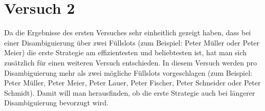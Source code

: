 \documentclass[12pt,a4paper]{scrartcl}
\begin{document}

\newpage
\section{Versuch 2}
\label{Verusch2}
Da die Ergebnisse des ersten Versuches sehr einheitlich gezeigt haben, dass bei einer Disambiguierung über zwei Füllslots (zum Beispiel: Peter Müller oder Peter Meier) die erste Strategie am effizientesten und beliebtesten ist, hat man sich zusätzlich für einen weiteren Versuch entschieden. In diesem Versuch werden pro Disambiguierung mehr als zwei mögliche Füllslots vorgeschlagen (zum Beispiel: Peter Müller, Peter Meier, Peter Lauer, Peter Fischer, Peter Schneider oder Peter Schmidt). Damit will man herausfinden, ob die erste Strategie auch bei längerer Disambiguierung bevorzugt wird.
\end{document}
